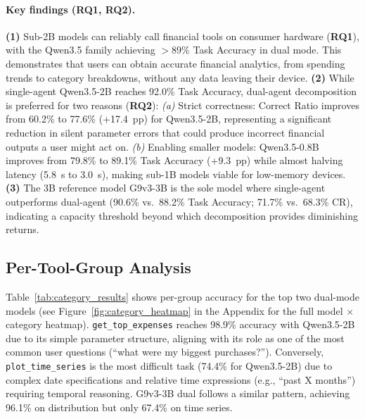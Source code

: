 \documentclass[11pt,twocolumn]{article}
\begin{document}
\paragraph{Key findings (RQ1, RQ2).}
\textbf{(1)} Sub-2B models can reliably call financial tools
on consumer hardware (\textbf{RQ1}), with the Qwen3.5 family
achieving $>$89\% Task Accuracy in dual mode.
This demonstrates that users can obtain accurate financial
analytics, from spending trends to category breakdowns, without
any data leaving their device.
\textbf{(2)} While single-agent Qwen3.5-2B reaches 92.0\% Task
Accuracy, dual-agent decomposition is preferred for two reasons
(\textbf{RQ2}):
\emph{(a)} Strict correctness: Correct Ratio improves from 60.2\%
to 77.6\% (+17.4~pp) for Qwen3.5-2B, representing a significant
reduction in silent parameter errors that could produce incorrect
financial outputs a user might act on.
\emph{(b)} Enabling smaller models: Qwen3.5-0.8B improves from
79.8\% to 89.1\% Task Accuracy (+9.3~pp) while almost halving
latency (5.8~s to 3.0~s), making sub-1B models viable for
low-memory devices.
\textbf{(3)} The 3B reference model G9v3-3B is the sole model
where single-agent outperforms dual-agent (90.6\% vs.\ 88.2\%
Task Accuracy; 71.7\% vs.\ 68.3\% CR), indicating a capacity
threshold beyond which decomposition provides diminishing returns.

\subsection{Per-Tool-Group Analysis}

Table~\ref{tab:category_results} shows per-group accuracy for the top
two dual-mode models (see Figure~\ref{fig:category_heatmap} in the Appendix for the full model $\times$ category heatmap).
\texttt{get\_top\_expenses} reaches 98.9\% accuracy with Qwen3.5-2B
due to its simple parameter structure, aligning with its role as one of
the most common user questions (``what were my biggest
purchases?'').
Conversely, \texttt{plot\_time\_series} is the most difficult task
(74.4\% for Qwen3.5-2B) due to complex date specifications and
relative time expressions (e.g., ``past X months'') requiring
temporal reasoning.
G9v3-3B dual follows a similar pattern, achieving 96.1\% on
distribution but only 67.4\% on time series.
\end{document}
